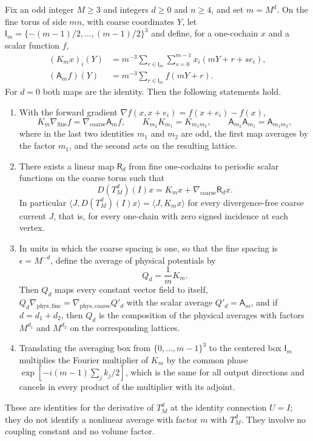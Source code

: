 \begin{lemma}\label{ch05:lem:flat-average-semigroup}
Fix an odd integer $M\ge3$ and integers $d\ge0$ and $n\ge4$, and set $m=M^d$. On the fine torus of side $mn$, with coarse coordinates $Y$, let $\mathsf I_m=\{-(m-1)/2,\ldots,(m-1)/2\}^3$ and define, for a one-cochain $x$ and a scalar function $f$,
\[
 \begin{aligned}
 (K_mx)_i(Y)&=m^{-3}\sum_{r\in\mathsf I_m}\sum_{s=0}^{m-1}x_i(mY+r+se_i),\\
 (\mathsf A_mf)(Y)&=m^{-3}\sum_{r\in\mathsf I_m}f(mY+r).
 \end{aligned}
\]
For $d=0$ both maps are the identity. Then the following statements hold.
\begin{enumerate}
\item With the forward gradient $\nabla f(x,x+e_i)=f(x+e_i)-f(x)$,
\[
 K_m\nabla_{\mathrm{fine}}f=\nabla_{\mathrm{coarse}}\mathsf A_mf,\qquad
 K_{m_2}K_{m_1}=K_{m_1m_2},\qquad
 \mathsf A_{m_2}\mathsf A_{m_1}=\mathsf A_{m_1m_2},
\]
where in the last two identities $m_1$ and $m_2$ are odd, the first map averages by the factor $m_1$, and the second acts on the resulting lattice.
\item There exists a linear map $\mathsf R_d$ from fine one-cochains to periodic scalar functions on the coarse torus such that
\[
 D(T_M^d)(I)x=K_mx+\nabla_{\mathrm{coarse}}\mathsf R_dx.
\]
In particular $\langle J,D(T_M^d)(I)x\rangle=\langle J,K_mx\rangle$ for every divergence-free coarse current $J$, that is, for every one-chain with zero signed incidence at each vertex.
\item In units in which the coarse spacing is one, so that the fine spacing is $\epsilon=M^{-d}$, define the average of physical potentials by
\[
 Q_d=\frac1mK_m.
\]
Then $Q_d$ maps every constant vector field to itself, $Q_d\nabla_{\mathrm{phys,fine}}=\nabla_{\mathrm{phys,coarse}}Q'_d$ with the scalar average $Q'_d=\mathsf A_m$, and if $d=d_1+d_2$, then $Q_d$ is the composition of the physical averages with factors $M^{d_1}$ and $M^{d_2}$ on the corresponding lattices.
\item Translating the averaging box from $\{0,\ldots,m-1\}^3$ to the centered box $\mathsf I_m$ multiplies the Fourier multiplier of $K_m$ by the common phase $\exp[-i(m-1)\sum_jk_j/2]$, which is the same for all output directions and cancels in every product of the multiplier with its adjoint.
\end{enumerate}
These are identities for the derivative of $T_M^d$ at the identity connection $U=I$; they do not identify a nonlinear average with factor $m$ with $T_M^d$. They involve no coupling constant and no volume factor.
\end{lemma}

